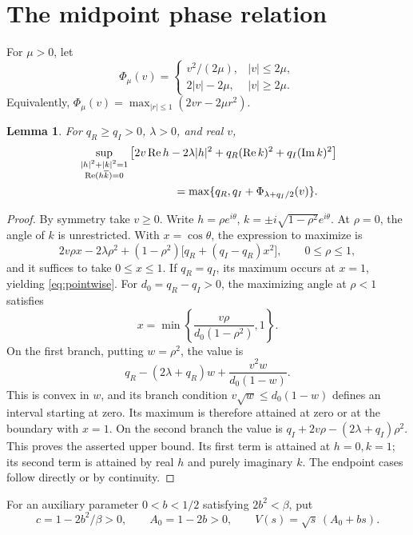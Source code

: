 \documentclass[11pt]{article}
\newtheorem{lemma}[theorem]{Lemma}
\theoremstyle{remark}\newtheorem{remark}[theorem]{Remark}
\DeclareMathOperator{\Rea}{Re}
\begin{document}
\section{The midpoint phase relation}

For \(\mu>0\), let
\begin{equation}\label{eq:phi}
\Phi_\mu(v)=
\begin{cases}
v^2/(2\mu),& |v|\le2\mu,\\
2|v|-2\mu,&|v|\ge2\mu.
\end{cases}
\end{equation}
Equivalently, \(\Phi_\mu(v)=\max_{|r|\le1}(2vr-2\mu r^2)\).

\begin{lemma}\label{lem:pointwise}
For \(q_R\ge q_I>0\), \(\lambda>0\), and real \(v\),
\begin{align}
&\sup_{\substack{|h|^2+|k|^2=1\\\Rea(h\overline k)=0}}
\left[2v\Rea h-2\lambda|h|^2
+q_R(\Rea k)^2+q_I(\operatorname{Im}k)^2\right]\notag\\
&\hspace{30mm}=\max\{q_R,q_I+\Phi_{\lambda+q_I/2}(v)\}.
\label{eq:pointwise}
\end{align}
\end{lemma}
\begin{proof}
By symmetry take \(v\ge0\). Write
\(h=\rho e^{i\theta}\),
\(k=\pm i\sqrt{1-\rho^2}e^{i\theta}\). At \(\rho=0\), the angle
of \(k\) is unrestricted. With \(x=\cos\theta\), the expression
to maximize is
\[
2v\rho x-2\lambda\rho^2
+(1-\rho^2)\bigl[q_R+(q_I-q_R)x^2\bigr],
\qquad 0\le\rho\le1,
\]
and it suffices to take \(0\le x\le1\). If \(q_R=q_I\), its
maximum occurs at \(x=1\), yielding \eqref{eq:pointwise}.
For \(d_0=q_R-q_I>0\), the maximizing angle at \(\rho<1\) satisfies
\[
x=\min\left\{\frac{v\rho}{d_0(1-\rho^2)},1\right\}.
\]
On the first branch, putting \(w=\rho^2\), the value is
\[
q_R-(2\lambda+q_R)w+\frac{v^2w}{d_0(1-w)}.
\]
This is convex in \(w\), and its branch condition
\(v\sqrt w\le d_0(1-w)\) defines an interval starting at zero.
Its maximum is therefore attained at zero or at the boundary with
\(x=1\). On the second branch the value is
\(q_I+2v\rho-(2\lambda+q_I)\rho^2\). This proves the asserted
upper bound. Its first term is attained at \(h=0,k=1\); its second
term is attained by real \(h\) and purely imaginary \(k\).
The endpoint cases follow directly or by continuity.
\end{proof}

For an auxiliary parameter \(0<b<1/2\) satisfying \(2b^2<\beta\), put
\begin{equation}\label{eq:cv}
c=1-2b^2/\beta>0,\qquad A_0=1-2b>0,
\qquad V(s)=\sqrt s\,(A_0+bs).
\end{equation}
\end{document}
